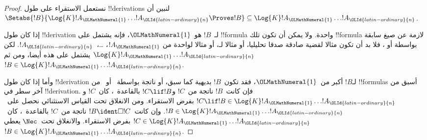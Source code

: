 \documentclass[../../../include/open-logic-section]{subfiles}
\begin{document}
\begin{proof}
  نستعمل الاستقراء على طول !!{derivation}s لنبين أن
  $\Setabs{!B}{\Log{K} !A_{\OLMathNumeral{1}} \dots !A_{\OLId{latin-ordinary}{n}} \Proves !B} \subseteq
  \Log{K} !A_{\OLMathNumeral{1}} \dots !A_{\OLId{latin-ordinary}{n}}$.

  إذا كان طول !!{derivation} لـ~$!B$ هو~${\OLMathNumeral{1}}$، فإنه يشتمل على
  !!{formula} واحدة. ولا يمكن أن تكون تلك !!{formula} لازمة عن صيغ
  سابقة بواسطة \MP{} أو \Nec، فلا بد أن تكون مثالا لقضية صادقة صدقا
  تحليليا، أو مثالا لـ، أو مثالا
  لواحدة من $!A_{\OLMathNumeral{1}}$، \dots،~$!A_{\OLId{latin-ordinary}{n}}$. لكن $\Log{K}!A_{\OLMathNumeral{1}}\dots!A_{\OLId{latin-ordinary}{n}}$ يشتمل
  على هذه أيضا، ومن ثم $!B \in \Log{K}!A_{\OLMathNumeral{1}} \dots !A_{\OLId{latin-ordinary}{n}}$.

  وأما إذا كان طول !!{derivation} لـ$!B$ أكبر من~${\OLMathNumeral{1}}$،
  فقد تكون~$!B$ بديهية كما سبق، أو ناتجة بواسطة~\MP{} أو~\Nec{}
  من !!{formula}s أسبق من آخر سطر في !!{derivation}.
  فإن كانت~$!B$ ناتجة من~$!C$ و$!C \lif !B$ بالقاعدة~\MP،
  كان~$!C$ و$!C \lif !B \in
  \Log{K}!A_{\OLMathNumeral{1}} \dots !A_{\OLId{latin-ordinary}{n}}$ بفرض الاستقراء. ومن الانغلاق تحت
  القياس الاستثنائي نحصل على~$!B \in \Log{K}!A_{\OLMathNumeral{1}} \dots !A_{\OLId{latin-ordinary}{n}}$.
  وإن كانت~$!B \ident \Box !C$ ناتجة من~$!C$ بالقاعدة~\Nec،
  كان~$!C
  \in \Log{K}!A_{\OLMathNumeral{1}} \dots !A_{\OLId{latin-ordinary}{n}}$ بفرض الاستقراء. والانغلاق
  تحت~$\Nec$ يعطي~$!B \in
  \Log{K}!A_{\OLMathNumeral{1}}\dots!A_{\OLId{latin-ordinary}{n}}$.


\end{proof}
\end{document}
